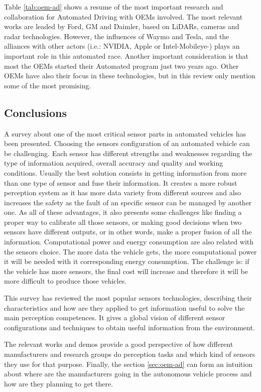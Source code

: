 Table \ref{tab:oem-ad} shows a resume of the most important research and 
collaboration for Automated Driving with OEMs involved. The most relevant works 
are leaded by Ford, GM and Daimler, based on LiDARs, cameras and radar 
technologies. However, the influences of Waymo and Tesla, and the alliances 
with other actors (i.e.: NVIDIA, Apple or Intel-Mobileye-) plays an important 
role in this automated race. Another important consideration is that most the 
OEMs started their Automated program just two years ago. Other OEMs have also 
their focus in these technologies, but in this review only mention some of the 
most promising.

\subsection{Conclusions}

A survey about one of the most critical sensor parts in automated vehicles has 
been presented. Choosing the sensors configuration of an automated vehicle can 
be challenging. Each sensor has different strengths and weaknesses regarding
the type of information acquired, overall accuracy and quality and working 
conditions. Usually the best solution consists in getting 
information from more than one type of sensor and fuse their information. It 
creates a more robust  perception system as it has more data variety from 
different sources and also increases the safety as the fault of an specific 
sensor can be managed by another one. As all of these advantages, it also 
presents some challenges like finding a proper way to calibrate all those 
sensors, or making good decisions when two sensors have different outputs, or 
in other words, make a proper fusion of all the information. Computational 
power and energy consumption are also related with the sensors choice. The more 
data the vehicle gets, the more computational power it will be needed with it 
corresponding energy consumption. The challenge is: if the vehicle has more 
sensors, the final cost will increase and therefore it will be more difficult  
to produce those vehicles.

This survey has reviewed the most popular sensors technologies, 
describing their characteristics and how are they applied to get information 
useful to solve the main perception competences. It gives a global vision of 
different sensor configurations and techniques to obtain useful information 
from the environment.

The relevant works and demos provide a good perspective of how different 
manufacturers and research groups do perception tasks and which kind of sensors 
they use for that purpose. 
Finally, the section \ref{sec:oem-ad} can form an intuition about where are the 
manufacturers going in the autonomous vehicle process and how are they planning 
to get there.


